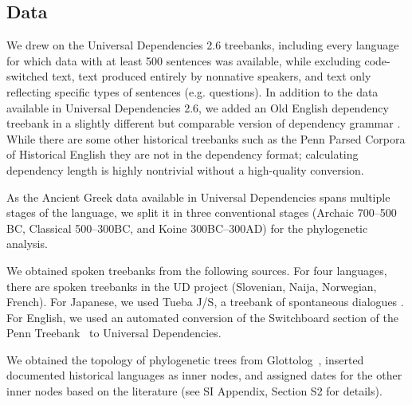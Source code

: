 \documentclass[9pt,twocolumn,twoside,lineno]{pnas-new}
\begin{document}
{%





\subsection*{Data}
We drew on the Universal Dependencies 2.6 treebanks, including every language for which data with at least 500 sentences was available, while excluding code-switched text, text produced entirely by nonnative speakers, and text only reflecting specific types of sentences (e.g. questions).
In addition to the data available in Universal Dependencies 2.6, we added an Old English dependency treebank in a slightly different but comparable version of dependency grammar \citep{bech2014iswoc}.
While there are some other historical treebanks such as the Penn Parsed Corpora of Historical English \citep{kroch2011penn} they are not in the dependency format; calculating dependency length is highly nontrivial without a high-quality conversion.

As the Ancient Greek data available in Universal Dependencies spans multiple stages of the language, we split it in three conventional stages (Archaic 700--500 BC, Classical 500--300BC, and Koine 300BC--300AD) for the phylogenetic analysis. 


We obtained spoken treebanks from the following sources.
For four languages, there are spoken treebanks in the UD project (Slovenian, Naija, Norwegian, French). For Japanese, we used Tueba J/S, a treebank of spontaneous dialogues \citep{hall2006conll}. For English, we used an automated conversion \citep{schuster2018sentences} of the Switchboard section of the Penn Treebank~\citep{marcus-building-1993} to Universal Dependencies.

We obtained the topology of phylogenetic trees from Glottolog~\citep{nordhoff2011glottolog}, inserted documented historical languages as inner nodes, and assigned dates for the other inner nodes based on the literature (see SI Appendix, Section S2 for details).




}
\end{document}
